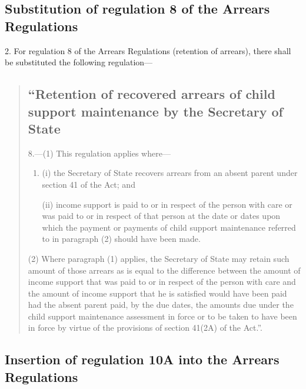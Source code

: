 \documentclass[12pt,a4paper]{article}
\begin{document}
\subsection[2. Substitution of regulation 8 of the Arrears Regulations]{Substitution of regulation 8 of the Arrears Regulations}

2.  For regulation 8 of the Arrears Regulations (retention of arrears), there shall be substituted the following regulation—
\begin{quotation}
\subsection*{“Retention of recovered arrears of child support maintenance by the Secretary of State}

8.—(1) This regulation applies where—
\begin{enumerate}\item[]
(i) the Secretary of State recovers arrears from an absent parent under section 41 of the Act; and

(ii) income support is paid to or in respect of the person with care or was paid to or in respect of that person at the date or dates upon which the payment or payments of child support maintenance referred to in paragraph (2) should have been made.
\end{enumerate}

(2) Where paragraph (1) applies, the Secretary of State may retain such amount of those arrears as is equal to the difference between the amount of income support that was paid to or in respect of the person with care and the amount of income support that he is satisfied would have been paid had the absent parent paid, by the due dates, the amounts due under the child support maintenance assessment in force or to be taken to have been in force by virtue of the provisions of section 41(2A) of the Act.”.
\end{quotation}

\subsection[3. Insertion of regulation 10A into the Arrears Regulations]{Insertion of regulation 10A into the Arrears Regulations}
\end{document}
